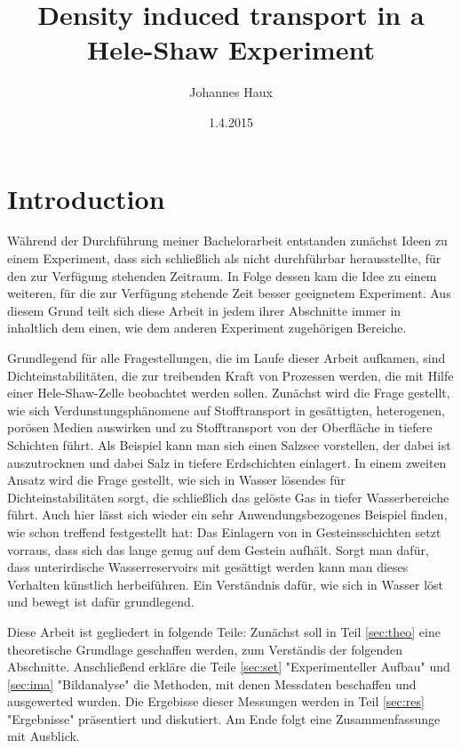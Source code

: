 \documentclass[oneside, a4paper, DIV=11]{scrartcl}
\title{Density induced transport in a Hele-Shaw Experiment}
\author{Johannes Haux}
\date{1.4.2015}
\begin{document}
\maketitle

\section{Introduction}

Während der Durchführung meiner Bachelorarbeit entstanden zunächst Ideen zu einem Experiment, dass sich schließlich als nicht durchführbar herausstellte, für den zur 
Verfügung stehenden Zeitraum. In Folge dessen kam die Idee zu einem weiteren, für die zur Verfügung stehende Zeit besser geeignetem Experiment. Aus diesem Grund teilt
sich diese Arbeit in jedem ihrer Abschnitte immer in inhaltlich dem einen, wie dem anderen Experiment zugehörigen Bereiche.

Grundlegend für alle Fragestellungen, die im Laufe dieser Arbeit aufkamen, sind Dichteinstabilitäten, die zur treibenden Kraft von Prozessen werden, die mit Hilfe
einer Hele-Shaw-Zelle beobachtet werden sollen.
Zunächst wird die Frage gestellt, wie sich Verdunstungsphänomene auf Stofftransport in gesättigten, heterogenen, porösen Medien auswirken und zu Stofftransport 
von der Oberfläche in tiefere Schichten führt. Als Beispiel kann man sich einen Salzsee vorstellen, der dabei ist auszutrocknen und dabei Salz in tiefere Erdschichten
einlagert.
In einem zweiten Ansatz wird die Frage gestellt, wie sich in Wasser lösendes \COT für Dichteinstabilitäten sorgt, die schließlich das gelöste Gas in tiefer Wasserbereiche 
führt. Auch hier lässt sich wieder ein sehr Anwendungsbezogenes Beispiel finden, wie schon \cite{fernandez} treffend festgestellt hat: Das Einlagern von \COT in
Gesteinsschichten setzt vorraus, dass sich das \COT lange genug auf dem Gestein aufhält. Sorgt man dafür, dass unterirdische Wasserreservoirs mit \COT gesättigt werden
kann man dieses Verhalten künstlich herbeiführen. Ein Verständnis dafür, wie sich \COT in Wasser löst und bewegt ist dafür grundlegend.

Diese Arbeit ist gegliedert in folgende Teile: Zunächst soll in Teil \ref{sec:theo} eine theoretische Grundlage geschaffen werden, zum Verständis der folgenden Abschnitte.
Anschließend erkläre die Teile \ref{sec:set} "Experimenteller Aufbau" und \ref{sec:ima} "Bildanalyse" die Methoden, mit denen Messdaten beschaffen und ausgewerted wurden.
Die Ergebisse dieser Messungen werden in Teil \ref{sec:res} "Ergebnisse" präsentiert und diskutiert.
Am Ende folgt eine Zusammenfassunge mit Ausblick.
\end{document}
